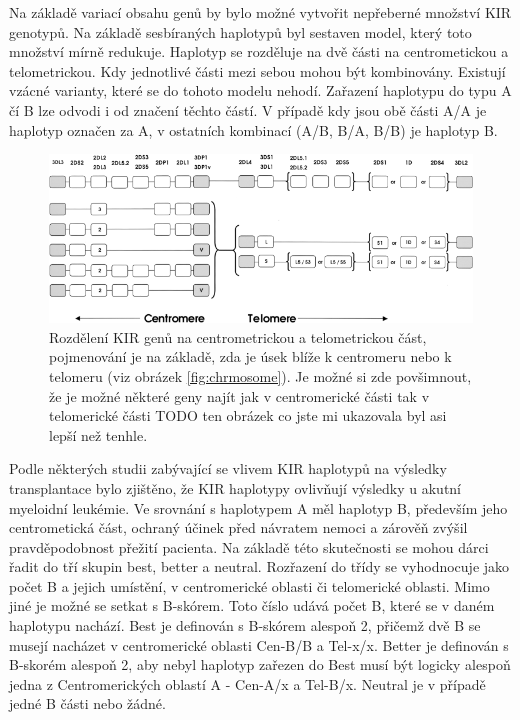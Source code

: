 \documentclass[czech,DP]{thesiskiv}
\numberwithin{equation}{section}
\begin{document}
\noindent
Na základě variací obsahu genů by bylo možné vytvořit nepřeberné množství KIR genotypů. Na základě sesbíraných haplotypů byl sestaven model, který toto množství mírně redukuje. Haplotyp se rozděluje na dvě části na centrometickou a telometrickou. Kdy jednotlivé části mezi sebou mohou být kombinovány. Existují vzácné varianty, které se do tohoto modelu nehodí. Zařazení haplotypu do typu A čí B lze odvodi i od značení těchto částí. V případě kdy jsou obě části A/A je haplotyp označen za A, v ostatních kombinací (A/B, B/A, B/B) je haplotyp B. \cite{KIR_haplotypy_ct}


\begin{figure}[H]		
		\centering
		\includegraphics[width=\textwidth]{./img/KIR_haplotypy.png}
		\caption{Rozdělení KIR genů na centrometrickou a telometrickou část, pojmenování je na základě, zda je úsek blíže k centromeru nebo k telomeru (viz obrázek \ref{fig:chrmosome}). Je možné si zde povšimnout, že je možné některé geny najít jak v centromerické části tak v telomerické části  TODO ten obrázek co jste mi ukazovala byl asi lepší než tenhle. \cite{KIR_haplotypy_ct}}
		\label{fig:kir_aplotypy_ct}
\end{figure}

\noindent
Podle některých studii zabývající se vlivem KIR haplotypů na výsledky transplantace bylo zjištěno, že KIR haplotypy ovlivňují výsledky u akutní myeloidní leukémie. Ve srovnání s haplotypem A měl haplotyp B, především jeho centrometická část, ochraný účinek před návratem nemoci a zárověň zvýšil pravděpodobnost přežití pacienta. Na základě této skutečnosti se mohou dárci řadit do tří skupin best, better a neutral. Rozřazení do třídy se vyhodnocuje jako počet B a jejich umístění, v centromerické oblasti či telomerické oblasti. Mimo jiné je možné se setkat s B-skórem. Toto číslo udává počet B, které se v daném haplotypu nachází. Best je definován s B-skórem alespoň 2, přičemž dvě B se musejí nacházet v centromerické oblasti Cen-B/B a Tel-x/x. Better je definován s B-skorém alespoň 2, aby nebyl haplotyp zařezen do Best musí být logicky alespoň jedna z Centromerických oblastí A - Cen-A/x a Tel-B/x. Neutral je v případě jedné B části nebo žádné. \cite{KIR_haplotypy}
\end{document}
